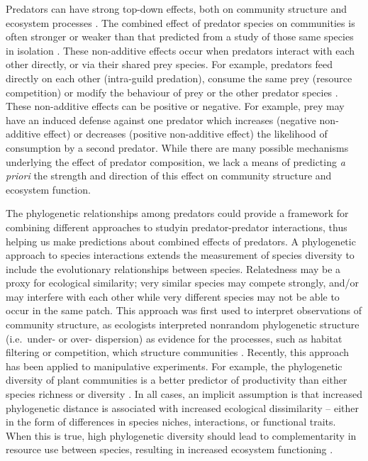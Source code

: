 \documentclass[11pt]{article}
\begin{document}
Predators can have strong top-down effects, both on community structure
and ecosystem processes \citealt{Estes2011}. The combined effect of
predator species on communities is often stronger or weaker than that
predicted from a study of those same species in isolation
\citealt{Sih1998a, Ives2005}. These non-additive effects occur when
predators interact with each other directly, or via their shared prey
species. For example, predators feed directly on each other (intra-guild
predation), consume the same prey (resource competition) or modify the
behaviour of prey or the other predator species
\citealt{Sih1998a, Griswold2006, Nystrom2001}. These non-additive effects
can be positive or negative. For example, prey may have an induced
defense against one predator which increases (negative non-additive
effect) or decreases (positive non-additive effect) the likelihood of
consumption by a second predator. While there are many possible
mechanisms underlying the effect of predator composition, we lack a
means of predicting \emph{a priori} the strength and direction of this
effect on community structure and ecosystem function.

The phylogenetic relationships among predators could provide a framework for combining different approaches to studyin predator-predator interactions, thus helping us make
predictions about combined effects of predators. A phylogenetic approach to species interactions
extends the measurement of species diversity to include the evolutionary
relationships between species. Relatedness may be a proxy for ecological similarity; very
similar species may compete strongly, and/or may interfere with each
other while very different species may not be able to occur in the same
patch. This approach was first used to interpret observations of
community structure, as ecologists interpreted nonrandom phylogenetic
structure (i.e.~under- or over- dispersion) as evidence for the
processes, such as habitat filtering or competition, which structure
communities \citealt{Webb2002, Cavender-Bares2009}. Recently, this
approach has been applied to manipulative experiments. For example, the
phylogenetic diversity of plant communities is a better predictor of
productivity than either species richness or diversity
\citealt[e.g.][]{Cadotte2009, Cadotte2008, Godoy2014}. In all cases, an
implicit assumption is that increased phylogenetic distance is
associated with increased ecological dissimilarity -- either in the form
of differences in species niches, interactions, or functional traits.
When this is true, high phylogenetic diversity should lead to
complementarity in resource use between species, resulting in increased
ecosystem functioning \citealt{Srivastava2012c}. 
\end{document}
